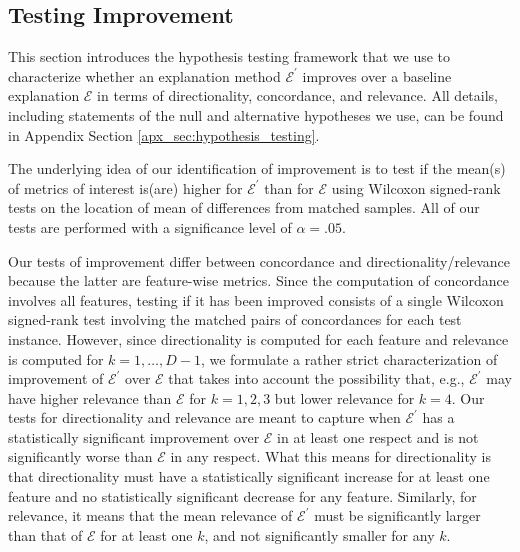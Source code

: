 \documentclass[12pt]{article}  %
\newcommand{\mE}{\mathcal{E}}
\begin{document}
    \subsection{Testing Improvement}
        \label{sec:improvement}
        This section introduces the hypothesis testing framework that we use to characterize whether an explanation method $\mE^\prime$ improves over a baseline explanation $\mE$ in terms of directionality, concordance, and relevance. All details, including statements of the null and alternative hypotheses we use, can be found in Appendix Section \ref{apx_sec:hypothesis_testing}.
        
        
        The underlying idea of our identification of improvement is to test if the mean(s) of metrics of interest is(are) higher for $\mE^\prime$ than for $\mE$ using Wilcoxon signed-rank tests on the location of mean of differences from  matched samples.
        All of our tests are performed with a significance level of $\alpha=.05$. 
        
        Our tests of improvement differ between concordance and directionality/relevance because the latter are feature-wise metrics. Since the computation of concordance involves all features, testing if it has been improved consists of a single Wilcoxon signed-rank test involving the matched pairs of concordances for each test instance. However, since directionality is computed for each feature and relevance is computed for $k=1,\ldots,D-1$, we formulate a rather strict characterization of improvement of $\mE^\prime$ over $\mE$ that takes into account the possibility that, e.g., $\mE^\prime$ may have higher relevance than $\mE$ for $k=1,2,3$ but lower relevance for $k=4$. Our tests for directionality and relevance are meant to capture when $\mE^\prime$ has a statistically significant improvement over $\mE$ in at least one respect and is not significantly worse than $\mE$ in any respect. What this means for directionality is that directionality must have a statistically significant increase for at least one feature and no statistically significant decrease for any feature. Similarly, for relevance, it means that the mean relevance of $\mE^\prime$ must be significantly larger than that of $\mE$ for at least one $k$, and not significantly smaller for any $k$.   
        
\end{document}

